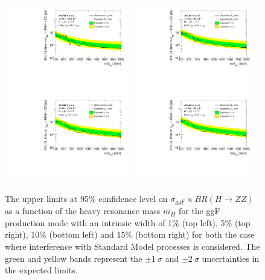 \begin{figure}[h]
    \begin{center}
    \includegraphics[width=0.48\textwidth]{figures/HMHZZ/results/Limits_LWA_withInt_1.pdf}
    \includegraphics[width=0.48\textwidth]{figures/HMHZZ/results/Limits_LWA_withInt_5.pdf} \\
    \includegraphics[width=0.48\textwidth]{figures/HMHZZ/results/Limits_LWA_withInt_10.pdf}
    \includegraphics[width=0.48\textwidth]{figures/HMHZZ/results/Limits_LWA_withInt_15.pdf} \\
    \end{center}
    \caption{The upper limits at 95\% confidence level on $\sigma_{ggF} \times BR(H\rightarrow ZZ)$
    as a function of the heavy resonance mass $m_{H}$ for the ggF production mode with an intrinsic width of 1\% (top left), 5\% (top right), 10\% (bottom left) and 15\% (bottom right) for both the case where interference with Standard Model processes is considered.
    The green and yellow bands represent the $\pm 1~\sigma$ and $\pm 2~\sigma$ uncertainties in the expected limits.
  }
    \label{fig:LWAlimits_ggF_201518_withInt}
\end{figure}

